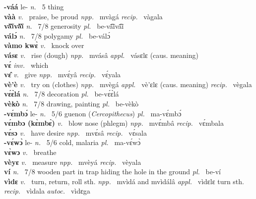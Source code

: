 \noindent 
{\bfseries -váá} le- {\itshape n.~} 5 thing    \\ 
{\bfseries vàà}  {\itshape v.~} praise, be proud   {\itshape npp.~} mvàgá {\itshape recip.~} vàgala  \\ 
{\bfseries vã́ĩ̀vã̀ĩ̀}  {\itshape n.~} 7/8 generosity {\itshape pl.~} be-vã́ĩ̀vã́ĩ̀    \\ 
{\bfseries válɔ́}  {\itshape n.~} 7/8 polygamy {\itshape pl.~} be-válɔ́    \\ 
{\bfseries vàmo kwɛ̀}  {\itshape v.~} knock over    \\ 
{\bfseries vásɛ}  {\itshape v.~} rise (dough)   {\itshape npp.~} mvásâ {\itshape appl.~} vásɛlɛ (caus. meaning)  \\ 
{\bfseries vɛ́}  {\itshape inv.~} which    \\ 
{\bfseries vɛ̂}  {\itshape v.~} give   {\itshape npp.~} mvɛ́yâ {\itshape recip.~} vɛ́yala  \\ 
{\bfseries vè'è}  {\itshape v.~} try on (clothes)   {\itshape npp.~} mvègá {\itshape appl.~} vè'ɛlɛ (caus. meaning) {\itshape recip.~} vègala  \\ 
{\bfseries vɛ́ɛ̀lá}  {\itshape n.~} 7/8 decoration {\itshape pl.~} be-vɛ́ɛ̀lá    \\ 
{\bfseries vèkò}  {\itshape n.~} 7/8 drawing, painting {\itshape pl.~} be-vèkò    \\ 
{\bfseries -vɛ́mbɔ́} le- {\itshape n.~} 5/6 guenon ({\itshape Cercopithecus}) {\itshape pl.~} ma-vɛ́mbɔ́    \\ 
{\bfseries vɛ́mbɔ (kɛ̀mbɛ̀)}  {\itshape v.~} blow nose (phlegm)   {\itshape npp.~} mvɛ́mbâ {\itshape recip.~} vɛ́mbala  \\ 
{\bfseries vɛ́sɔ}  {\itshape v.~} have desire   {\itshape npp.~} mvɛ́sâ {\itshape recip.~} vɛ́sala  \\ 
{\bfseries -vɛ́wɔ̀} le- {\itshape n.~} 5/6 cold, malaria {\itshape pl.~} ma-vɛ́wɔ̀   \\ 
{\bfseries vɛ̀wɔ}  {\itshape v.~} breathe    \\ 
{\bfseries vèyɛ}  {\itshape v.~} measure   {\itshape npp.~} mvèyá {\itshape recip.~} vèyala  \\ 
{\bfseries ví}  {\itshape n.~} 7/8 wooden part in trap hiding the hole in the ground {\itshape pl.~} be-ví    \\ 
{\bfseries vìdɛ}  {\itshape v.~} turn, return, roll sth.   {\itshape npp.~} mvìdá and mvìdálâ {\itshape appl.~} vìdɛlɛ turn sth. {\itshape recip.~} vìdala {\itshape autoc.~} vìdɛga  \\ 
